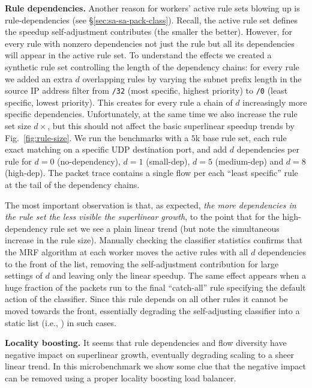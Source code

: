 \noindent%
\textbf{Rule dependencies.} %
Another reason for workers' active rule sets blowing up is rule-dependencies (see \S\ref{sec:sa-sa-pack-class}). Recall, the active rule set defines the speedup self-adjustment contributes (the smaller the better). However, for every rule with nonzero dependencies not just the rule but all its dependencies will appear in the active rule set. To understand the effects we created a synthetic rule set controlling the length of the dependency chains: for every rule we added an extra $d$ overlapping rules by varying the subnet prefix length in the source IP address filter from \texttt{/32} (most specific, highest priority) to \texttt{/0} (least specific, lowest priority). This creates for every rule a chain of $d$ increasingly more specific dependencies. Unfortunately, at the same time we also increase the rule set size $d\times$, but this should not affect the basic superlinear speedup trends by Fig.~\ref{fig:rule-size}. We run the benchmarks with a $5$k base rule set, each rule exact matching on a specific UDP destination port, and add $d$ dependencies per rule for $d=0$ (no-dependency), $d=1$ (small-dep), $d=5$ (medium-dep) and $d=8$ (high-dep). The packet trace contains a single flow per each ``least specific'' rule at the tail of the dependency chains.

The most important observation is that, as expected, \emph{the more dependencies in the rule set the less visible the superlinear growth}, to the point that for the high-dependency rule set we see a plain linear trend (but note the simultaneous increase in the rule size). Manually checking the classifier statistics confirms that the MRF algorithm at each worker moves the active rules with all $d$ dependencies to the front of the list, removing the self-adjustment contribution for large settings of $d$ and leaving only the linear speedup. The same effect appears when a huge fraction of the packets run to the final ``catch-all'' rule specifying the default action of the classifier. Since this rule depends on all other rules it cannot be moved towards the front, essentially degrading the self-adjusting classifier into a static list (i.e., \nftables) in such cases.

\noindent%
\textbf{Locality boosting.} %
It seems that rule dependencies and flow diversity have negative impact on superlinear growth, eventually degrading scaling to a sheer linear trend. In this microbenchmark we show some clue that the negative impact can be removed using a proper locality boosting load balancer.

